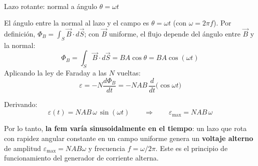 \documentclass[12pt,letterpaper]{article}
\newcommand{\eps}{\varepsilon}
\begin{document}
\noindent
\begin{minipage}[t]{0.42\textwidth}
\centering\vspace{0pt}
\\[2pt]
{\footnotesize Lazo rotante: normal a \'angulo $\theta=\omega t$}
\end{minipage}%
\hfill
\begin{minipage}[t]{0.55\textwidth}
\vspace{0pt}
El \'angulo entre la normal al lazo y el campo es $\theta=\omega t$ (con $\omega=2\pi f$). Por
definici\'on, $\Phi_B = \int_S \vec{B}\cdot d\vec{S}$; con $\vec{B}$ uniforme, el flujo depende del
\'angulo entre $\vec{B}$ y la normal:
\[
    \Phi_B = \int_S \vec{B}\cdot d\vec{S} = B A\cos\theta = B A\cos(\omega t)
\]
Aplicando la ley de Faraday a las $N$ vueltas:
\[
    \eps = -N\frac{d\Phi_B}{dt}
         = -N A B\,\frac{d}{dt}\!\big(\cos\omega t\big)
\]
\end{minipage}

\medskip

\noindent Derivando:
\[
    \boxed{\eps(t) = N A B\,\omega\,\sin(\omega t)}
    \qquad\Longrightarrow\qquad
    \eps_{\max} = N A B\,\omega
\]

\noindent Por lo tanto, \textbf{la fem var\'ia sinusoidalmente en el tiempo}: un lazo que rota con
rapidez angular constante en un campo uniforme genera un \textbf{voltaje alterno} de amplitud
$\eps_{\max}=NAB\omega$ y frecuencia $f=\omega/2\pi$. Este es el principio de funcionamiento del
generador de corriente alterna.

\vspace{0.8cm}
\end{document}
